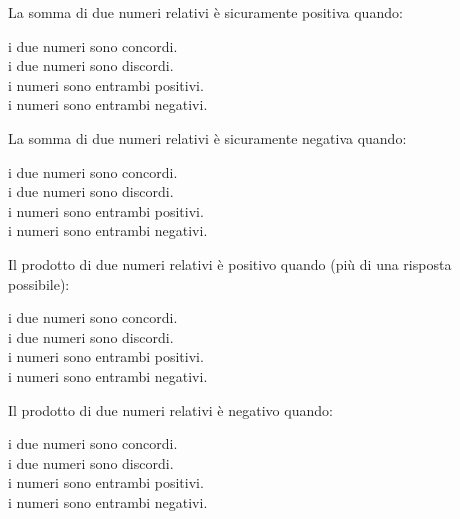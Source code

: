 \begin{esercizio}
La somma di due numeri relativi è sicuramente positiva quando:
 \begin{htmulticols}{2}
 \noindent
  \quad i due numeri sono concordi.\\
  \quad i due numeri sono discordi.\\
  \quad i numeri sono entrambi positivi.\\
  \quad i numeri sono entrambi negativi.
 \end{htmulticols}
\end{esercizio}

\begin{esercizio}
La somma di due numeri relativi è sicuramente negativa quando:
 \begin{htmulticols}{2}
 \noindent
  \quad i due numeri sono concordi.\\
  \quad i due numeri sono discordi.\\
  \quad i numeri sono entrambi positivi.\\
  \quad i numeri sono entrambi negativi.
 \end{htmulticols}
\end{esercizio}

\begin{esercizio}
Il prodotto di due numeri relativi è positivo quando (più di una risposta 
possibile):
 \begin{htmulticols}{2}
 \noindent
  \quad i due numeri sono concordi.\\
  \quad i due numeri sono discordi.\\
  \quad i numeri sono entrambi positivi.\\
  \quad i numeri sono entrambi negativi.
 \end{htmulticols}
\end{esercizio}

\begin{esercizio}
Il prodotto di due numeri relativi è negativo quando:
 \begin{htmulticols}{2}
 \noindent
  \quad i due numeri sono concordi.\\
  \quad i due numeri sono discordi.\\
  \quad i numeri sono entrambi positivi.\\
  \quad i numeri sono entrambi negativi.
 \end{htmulticols}
\end{esercizio}

